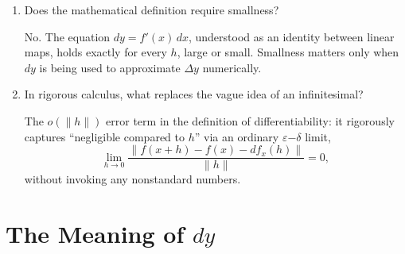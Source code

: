 \documentclass{self-check}
\begin{document}
\begin{enumerate}[resume, leftmargin=*, itemsep=8pt]
\item Does the mathematical definition require smallness?
\begin{answer}
No. The equation \(dy=f'(x)\,dx\), understood as an identity between linear maps, holds exactly for every \(h\), large or small. Smallness matters only when \(dy\) is being used to approximate \(\Delta y\) numerically.
\end{answer}

\item In rigorous calculus, what replaces the vague idea of an infinitesimal?
\begin{answer}
The \(o(\|h\|)\) error term in the definition of differentiability: it rigorously captures ``negligible compared to \(h\)'' via an ordinary \(\varepsilon\)\(-\)\(\delta\) limit,
\[
\lim_{h\to0}\frac{\|f(x+h)-f(x)-df_x(h)\|}{\|h\|}=0,
\]
without invoking any nonstandard numbers.
\end{answer}

\end{enumerate}

\section{The Meaning of \texorpdfstring{$dy$}{dy}}
\end{document}
